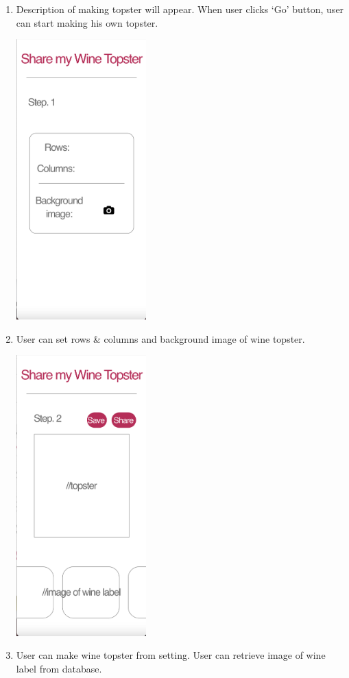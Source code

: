 \documentclass[conference]{IEEEtran}
\numberwithin{figure}{subsection}
\begin{document}
\begin{enumerate}
\begin{enumerate}
\begin{enumerate}
\begin{enumerate}
            \item Description of making topster will appear. When user clicks ‘Go’ button, user can start making his own topster.
              \centerline{\includegraphics[width=5cm]{top1.png}}
              \item User can set rows \& columns and background image of wine topster.
              \centerline{\includegraphics[width=5cm]{top2.png}}
            \item User can make wine topster from setting. User can retrieve image of wine label from database.
        \end{enumerate}

\end{enumerate}
\end{enumerate}
\end{enumerate}
\end{document}
